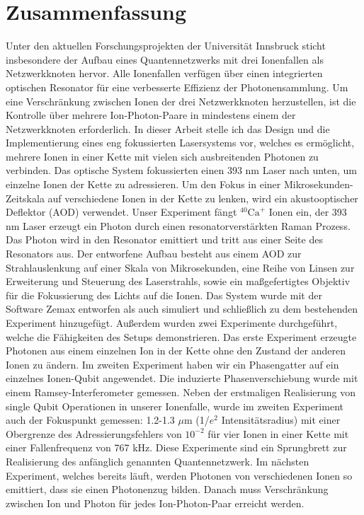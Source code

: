 \documentclass[english, a4paper, 12pt, twoside]{book}
\numberwithin{equation}{section} %
\begin{document}
\section*{Zusammenfassung}
Unter den aktuellen Forschungsprojekten der Universität Innsbruck sticht insbesondere der Aufbau eines Quantennetzwerks mit drei Ionenfallen als
Netzwerkknoten hervor.
Alle Ionenfallen verfügen über einen integrierten optischen Resonator für eine verbesserte Effizienz der Photonensammlung.
Um eine Verschränkung zwischen Ionen der drei Netzwerkknoten herzustellen, ist die Kontrolle über mehrere Ion-Photon-Paare
in mindestens einem der Netzwerkknoten erforderlich. In dieser Arbeit stelle ich das Design
und die Implementierung eines eng fokussierten Lasersystems vor, welches es ermöglicht, mehrere Ionen in einer Kette
mit vielen sich ausbreitenden Photonen zu verbinden. Das optische System fokussierten einen 393 nm Laser
nach unten, um einzelne Ionen der Kette zu adressieren. Um den Fokus in einer Mikrosekunden-Zeitskala auf verschiedene Ionen in der Kette zu lenken, wird ein akustooptischer Deflektor (AOD) verwendet.
Unser Experiment fängt $^{40}\text{Ca}^+$ Ionen ein, der 393 nm Laser erzeugt ein Photon durch einen
resonatorverstärkten Raman Prozess. Das Photon wird in den Resonator emittiert und tritt aus einer Seite des Resonators aus. Der entworfene Aufbau besteht aus einem AOD zur Strahlauslenkung auf einer Skala von Mikrosekunden, eine Reihe von Linsen zur Erweiterung und Steuerung des Laserstrahls, sowie ein ma{\ss}gefertigtes
Objektiv für die Fokussierung des Lichts auf die Ionen. Das System wurde mit der Software Zemax entworfen als auch simuliert
und schließlich zu dem bestehenden Experiment hinzugefügt. Außerdem wurden
zwei Experimente durchgeführt, welche die Fähigkeiten des Setups demonstrieren. Das erste Experiment
erzeugte Photonen aus einem einzelnen Ion in der Kette ohne den Zustand der anderen Ionen zu ändern.
Im zweiten Experiment haben wir ein Phasengatter auf ein einzelnes Ionen-Qubit angewendet.
Die induzierte Phasenverschiebung wurde mit einem Ramsey-Interferometer gemessen. Neben der erstmaligen Realisierung von single Qubit Operationen in unserer Ionenfalle, wurde im zweiten Experiment auch der Fokuspunkt gemessen: 1.2-1.3 $\mu$m (1/$e^2$ Intensitätsradius) mit einer Obergrenze des Adressierungsfehlers von $10^{-2}$ für vier Ionen in einer Kette mit einer Fallenfrequenz von 767 kHz.
Diese Experimente sind ein Sprungbrett zur Realisierung des anfänglich genannten
Quantennetzwerk. Im nächsten Experiment, welches bereits läuft, werden Photonen von verschiedenen Ionen so emittiert, dass sie einen Photonenzug bilden. Danach muss Verschränkung zwischen Ion und Photon für jedes Ion-Photon-Paar erreicht werden.
\end{document}
